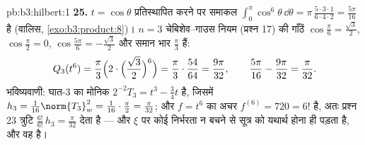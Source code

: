 \begin{solution}{pb:b3:hilbert:1}
\textbf{25.} $t = \cos\theta$ प्रतिस्थापित करने पर समाकल
$\int_0^\pi\cos^6\theta\,\dd\theta =
\pi\,\frac{5\cdot3\cdot1}{6\cdot4\cdot2} = \frac{5\pi}{16}$
है (वालिस, \cref{exo:b3:product:8})। $n = 3$ चेबिशेव--गाउस नियम (प्रश्न 17) की गाँठें
$\cos\frac\pi6 = \frac{\sqrt3}2$, $\cos\frac\pi2 = 0$, $\cos\frac{5\pi}6 = -\frac{\sqrt3}2$ और समान भार $\frac\pi3$ हैं:
\[
Q_3(t^6) = \frac\pi3\Bigl(2\cdot\Bigl(\frac{\sqrt3}2
\Bigr)^{6}\Bigr) = \frac\pi3\cdot\frac{54}{64}
= \frac{9\pi}{32},
\qquad
\frac{5\pi}{16} - \frac{9\pi}{32} = \frac\pi{32} .
\]
भविष्यवाणी: घात-$3$ का मोनिक  $2^{-2}T_3 = t^3 - \frac34t$ है, जिसमें $h_3 =
\frac1{16}\norm{T_3}_w^2 = \frac1{16}\cdot\frac\pi2 =
\frac\pi{32}$;
और $f = t^6$ का अचर $f^{(6)} = 720 =
6!$ है, अतः प्रश्न 23 त्रुटि $\frac{6!}{6!}\,h_3 =
\frac\pi{32}$ देता है ---
और $\xi$ पर कोई निर्भरता न बचने से सूत्र को यथार्थ होना ही पड़ता
है, और वह है।
\end{solution}
